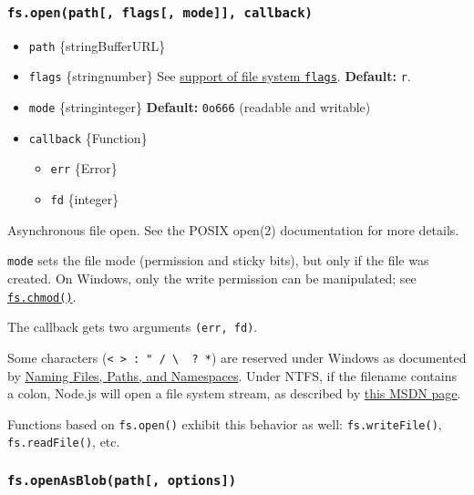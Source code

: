 \subsubsection{\texorpdfstring{\texttt{fs.open(path{[},\ flags{[},\ mode{]}{]},\ callback)}}{fs.open(path{[}, flags{[}, mode{]}{]}, callback)}}\label{fs.openpath-flags-mode-callback}

\begin{itemize}
\tightlist
\item
  \texttt{path} \{string\textbar Buffer\textbar URL\}
\item
  \texttt{flags} \{string\textbar number\} See
  \hyperref[file-system-flags]{support of file system \texttt{flags}}.
  \textbf{Default:} \texttt{\textquotesingle{}r\textquotesingle{}}.
\item
  \texttt{mode} \{string\textbar integer\} \textbf{Default:}
  \texttt{0o666} (readable and writable)
\item
  \texttt{callback} \{Function\}

  \begin{itemize}
  \tightlist
  \item
    \texttt{err} \{Error\}
  \item
    \texttt{fd} \{integer\}
  \end{itemize}
\end{itemize}

Asynchronous file open. See the POSIX open(2) documentation for more
details.

\texttt{mode} sets the file mode (permission and sticky bits), but only
if the file was created. On Windows, only the write permission can be
manipulated; see
\hyperref[fschmodpath-mode-callback]{\texttt{fs.chmod()}}.

The callback gets two arguments \texttt{(err,\ fd)}.

Some characters
(\texttt{\textless{}\ \textgreater{}\ :\ "\ /\ \textbackslash{}\ \textbar{}\ ?\ *})
are reserved under Windows as documented by
\href{https://docs.microsoft.com/en-us/windows/desktop/FileIO/naming-a-file}{Naming
Files, Paths, and Namespaces}. Under NTFS, if the filename contains a
colon, Node.js will open a file system stream, as described by
\href{https://docs.microsoft.com/en-us/windows/desktop/FileIO/using-streams}{this
MSDN page}.

Functions based on \texttt{fs.open()} exhibit this behavior as well:
\texttt{fs.writeFile()}, \texttt{fs.readFile()}, etc.

\subsubsection{\texorpdfstring{\texttt{fs.openAsBlob(path{[},\ options{]})}}{fs.openAsBlob(path{[}, options{]})}}\label{fs.openasblobpath-options}

